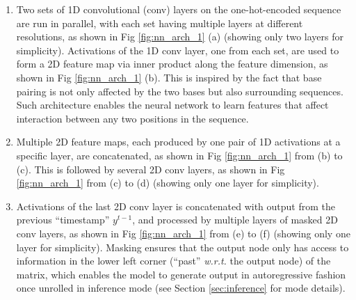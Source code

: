 \documentclass{article}
\begin{document}

%


\begin{enumerate}[leftmargin=*]

    \item \label{enum:step_1} Two sets of 1D convolutional (conv) layers on the one-hot-encoded sequence are run in parallel,
     with each set having multiple layers at different resolutions,
    as shown in Fig \ref{fig:nn_arch_1} (a) (showing only two layers for simplicity).
    Activations of the 1D conv layer, one from each set, are used to form a 2D feature map
via inner product along the feature dimension, as shown in Fig \ref{fig:nn_arch_1} (b).
This is inspired by the fact that base pairing
is not only affected by the two bases but also surrounding sequences.
Such architecture enables the neural network to learn features that affect
interaction between any two positions in the sequence.

    \item \label{enum:step_2} Multiple 2D feature maps, each produced by one pair of 1D activations at a specific layer,
are concatenated, as shown in Fig \ref{fig:nn_arch_1} from (b) to (c).
This is followed by several 2D conv layers, as shown in Fig \ref{fig:nn_arch_1} from (c) to (d) (showing only one layer for simplicity).



    \item \label{enum:step_3} Activations of the last 2D conv layer is concatenated with output
    from the previous ``timestamp'' $y^{t-1}$,
and processed by multiple layers of masked 2D conv layers, as shown in Fig \ref{fig:nn_arch_1} from (e) to (f)
(showing only one layer for simplicity).
Masking ensures that the output node only has access to
    information in the lower left corner (``past'' \textit{w.r.t.} the output node) of the matrix,
    which enables the model to generate output in autoregressive fashion once unrolled in inference mode (see Section \ref{sec:inference} for mode details).


\end{enumerate}
\end{document}
